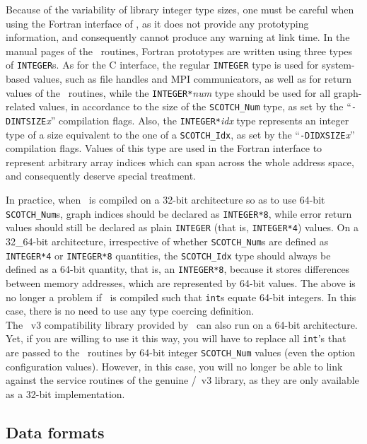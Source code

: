 Because of the variability of library integer type sizes, one must be
careful when using the Fortran interface of \scotch, as it does not
provide any prototyping information, and consequently cannot produce
any warning at link time. In the manual pages of the
\libscotch\ routines, Fortran prototypes are written using three types
of {\tt INTEGER}s. As for the C interface, the regular {\tt INTEGER}
type is used for system-based values, such as file handles and MPI
communicators, as well as for return values of the
\libscotch\ routines, while the {\tt INTEGER*}{\it num} type
should be used for all graph-related values, in accordance to the size
of the {\tt SCOTCH\_\lbt Num} type, as set by the
``{\tt -DINTSIZE}{\it x}'' compilation flags. Also, the
{\tt INTEGER*}{\it idx} type represents an integer type of a size
equivalent to the one of a {\tt SCOTCH\_\lbt Idx}, as set by the
``{\tt -DIDXSIZE}{\it x}'' compilation flags. Values of this type are
used in the Fortran interface to represent arbitrary array indices
which can span across the whole address space, and consequently
deserve special treatment.

In practice, when \scotch\ is compiled on a 32-bit architecture so as
to use 64-bit {\tt SCOTCH\_\lbt Num}s, graph indices should be
declared as {\tt INTEGER*8}, while error return values
should still be declared as plain {\tt INTEGER} (that is,
{\tt INTEGER*4}) values. On a 32\_64-bit architecture, irrespective of
whether {\tt SCOTCH\_\lbt Num}s are defined as {\tt INTEGER*4}
or {\tt INTEGER*8} quantities, the {\tt SCOTCH\_\lbt Idx} type
should always be defined as a 64-bit quantity, that is, an
{\tt INTEGER*8}, because it stores differences between memory
addresses, which are represented by 64-bit values.
The above is no longer a problem if \scotch\ is compiled such that
{\tt int}s equate 64-bit integers. In this case, there is no need to
use any type coercing definition.
\\

The \metis\ v3 compatibility library provided by \scotch\ can also
run on a 64-bit architecture. Yet, if you are willing to use it this
way, you will have to replace all {\tt int}'s that are passed to the
\metis\ routines by 64-bit integer {\tt SCOTCH\_\lbt Num} values (even
the option configuration values). However, in this case, you will no
longer be able to link against the service routines of the genuine
\metis/\parmetis\ v3 library, as they are only available as a 32-bit
implementation.

\subsection{Data formats}

